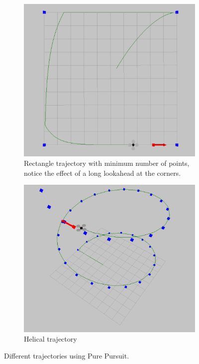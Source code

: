 \documentclass[hidelinks,BTech]{iitmdiss}
\begin{document}
\begin{figure}[H]
  \centering
  \begin{subfigure}[t]{0.45\textwidth}
  \includegraphics[width=\textwidth]{Pure_Pursuit_rect.png}
      \caption{Rectangle trajectory with minimum number of points, notice the effect of a long lookahead at the corners.}
  \end{subfigure}
  \begin{subfigure}[t]{0.45\textwidth}
    \centering
      \includegraphics[width=\textwidth]{Pure_Pursuit_helix.png}
      \caption{Helical trajectory}
  \end{subfigure}
  \caption{Different trajectories using Pure Pursuit.}
\end{figure}
\end{document}
